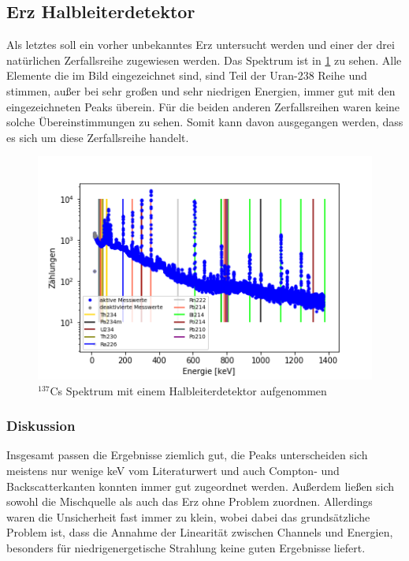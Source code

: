 \newpage
\subsection{Erz Halbleiterdetektor}
Als letztes soll ein vorher unbekanntes Erz untersucht werden und einer der drei natürlichen Zerfallsreihe zugewiesen werden.  Das Spektrum ist in \cref{Erz_pn} zu sehen. Alle Elemente die im Bild eingezeichnet sind, sind Teil der Uran-238 Reihe und stimmen, außer bei sehr großen und sehr niedrigen Energien, immer gut mit den eingezeichneten Peaks überein. Für die beiden anderen Zerfallsreihen waren keine solche Übereinstimmungen zu sehen. Somit kann davon ausgegangen werden, dass es sich um diese Zerfallsreihe handelt.

\begin{figure}[ht]
	\centering
	\includegraphics[scale=0.8]{Erz_pn_.png}
	\caption{$^{137}$Cs Spektrum mit einem Halbleiterdetektor aufgenommen}
	\label{Erz_pn}
\end{figure}





\newpage
\subsubsection{Diskussion}
Insgesamt passen die Ergebnisse ziemlich gut, die Peaks unterscheiden sich meistens nur wenige keV vom Literaturwert  und auch Compton- und Backscatterkanten konnten immer gut zugeordnet werden. Außerdem ließen sich sowohl die Mischquelle als auch das Erz ohne Problem zuordnen. Allerdings waren die Unsicherheit fast immer zu klein, wobei dabei das grundsätzliche Problem ist, dass die Annahme der Linearität zwischen Channels und Energien, besonders für niedrigenergetische Strahlung keine guten Ergebnisse liefert. 


